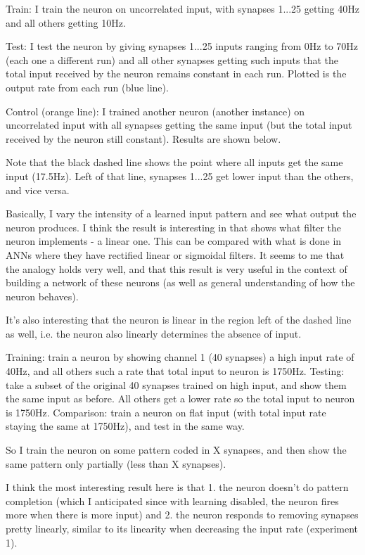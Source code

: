 \documentclass[a4paper,12pt]{report}
\theoremstyle{definition}
\begin{document}
Train: I train the neuron on uncorrelated input, with synapses 1...25 getting 40Hz and all others getting 10Hz.

Test: I test the neuron by giving synapses 1...25 inputs ranging from 0Hz to 70Hz (each one a different run) and all other synapses getting such inputs that the total input received by the neuron remains constant in each run. Plotted is the output rate from each run (blue line).

Control (orange line): I trained another neuron (another instance) on uncorrelated input with all synapses getting the same input (but the total input received by the neuron still constant). Results are shown below.

Note that the black dashed line shows the point where all inputs get the same input (17.5Hz). Left of that line, synapses 1...25 get lower input than the others, and vice versa.

Basically, I vary the intensity of a learned input pattern and see what output the neuron produces. I think the result is interesting in that  shows what filter the neuron implements - a linear one. This can be compared with what is done in ANNs where they have rectified linear or sigmoidal filters. It seems to me that the analogy holds very well, and that this result is very useful in the context of building a network of these neurons (as well as general understanding of how the neuron behaves).

It's also interesting that the neuron is linear in the region left of the dashed line as well, i.e. the neuron also linearly determines the absence of input.

Training: train a neuron by showing channel 1 (40 synapses) a high input rate of 40Hz, and all others such a rate that total input to neuron is 1750Hz.
Testing: take a subset of the original 40 synapses trained on high input, and show them the same input as before. All others get a lower rate so the total input to neuron is 1750Hz.
Comparison: train a neuron on flat input (with total input rate staying the same at 1750Hz), and test in the same way.

So I train the neuron on some pattern coded in X synapses, and then show the same pattern only partially (less than X synapses).

I think the most interesting result here is that
1. the neuron doesn't do pattern completion (which I anticipated since with learning disabled, the neuron fires more when there is more input) and
2. the neuron responds to removing synapses pretty linearly, similar to its linearity when decreasing the input rate (experiment 1).
\end{document}
